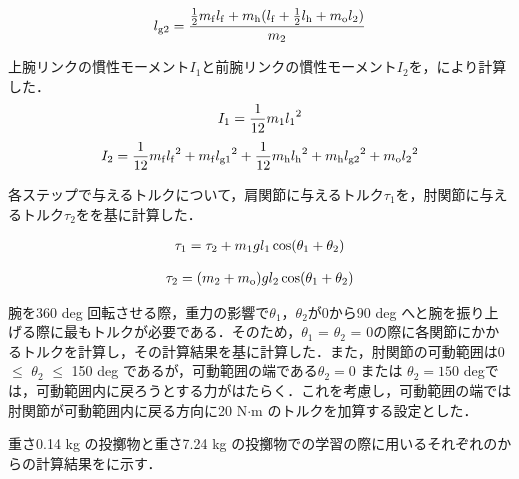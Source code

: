 \begin{eqnarray}
  \equlabel{2.28}
  l_{\mathrm{g2}}=\frac{\frac{1}{2}m_{\mathrm{f}}l_{\mathrm{f}}+m_{\mathrm{h}}(l_{\mathrm{f}}+\frac{1}{2}l_{\mathrm{h}}+m_{\mathrm{o}}l_{2})}{m_{2}}
\end{eqnarray}

上腕リンクの慣性モーメント$I_{1}$と前腕リンクの慣性モーメント$I_{2}$を，により計算した．
\begin{eqnarray}
  \equlabel{2.29}
  I_{1}=\frac{1}{12}m_{1}{l_{1}}^{2}
\end{eqnarray}
\begin{eqnarray}
  \equlabel{2.30}
  I_{2}=\frac{1}{12}m_{\mathrm{f}}{l_{\mathrm{f}}}^{2}+m_{\mathrm{f}}{l_{\mathrm{g1}}}^{2}+\frac{1}{12}m_{\mathrm{h}}{l_{\mathrm{h}}}^{2}+m_{\mathrm{h}}{l_{\mathrm{g2}}}^{2}+m_{\mathrm{o}}{l_{2}}^{2}
\end{eqnarray}

各ステップで与えるトルクについて，肩関節に与えるトルク$\tau_{1}$を，肘関節に与えるトルク$\tau_{2}$をを基に計算した．

\begin{eqnarray}
  \equlabel{2.31}
  \tau_{1} = \tau_{2} + m_{1}gl_{1}\cos(\theta_{1} + \theta_{2})
\end{eqnarray}

\begin{eqnarray}
  \equlabel{2.32}
  \tau_{2} = (m_{2} + m_{\mathrm{o}})gl_{2}\cos(\theta_{1} + \theta_{2})
\end{eqnarray}

腕を360 deg 回転させる際，重力の影響で$\theta_{1}$，$\theta_{2}$が0から90 deg へと腕を振り上げる際に最もトルクが必要である．そのため，$\theta_{1}$ = $\theta_{2}$ = 0の際に各関節にかかるトルクを計算し，その計算結果を基に計算した．また，肘関節の可動範囲は0 $\le$ $\theta_{2}$ $\le$ 150 deg であるが，可動範囲の端である$\theta_{2} = 0$ または $\theta_{2} = 150$ degでは，可動範囲内に戻ろうとする力がはたらく．これを考慮し，可動範囲の端では肘関節が可動範囲内に戻る方向に20 N$\cdot$m のトルクを加算する設定とした．

重さ0.14 kg の投擲物と重さ7.24 kg の投擲物での学習の際に用いるそれぞれのからの計算結果をに示す．

